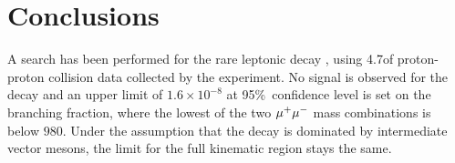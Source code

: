 \section{Conclusions}
\label{sec:conclusions}

A search has been performed for the rare leptonic decay \Bmumumu, using
4.7\invfb of proton-proton collision data collected by the \lhcb experiment.
No signal is observed for the \Bmumumu decay and an upper limit of 
$1.6\times 10^{-8}$ at 95\%~confidence level is set on the branching
fraction, where the lowest of the two ${\mu^+\mu^-}$ mass combinations is below
$980$\mevcc. Under the assumption that the decay is dominated by
intermediate vector mesons, the limit for the full kinematic region stays
the same.
